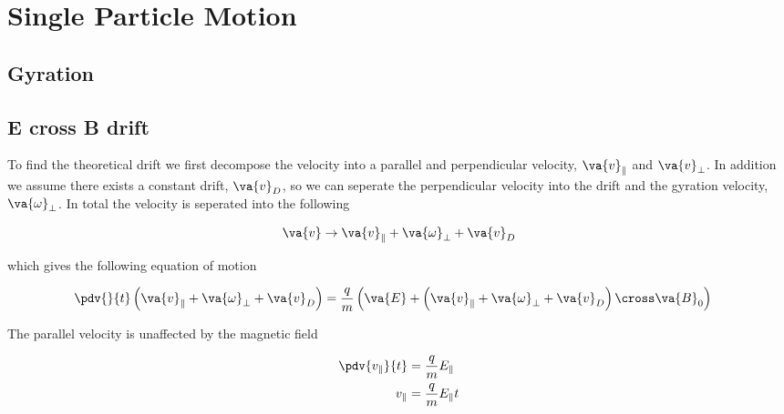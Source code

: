 \section{Single Particle Motion}

    \subsection{Gyration}

    \subsection{E cross B drift}
    To find the theoretical drift we first decompose the velocity into a parallel and perpendicular velocity, $\va{v}_\parallel $ and $\va{v}_\perp $. In addition we assume there exists a constant drift, \(\va{v}_D\), so we can seperate the perpendicular velocity into the drift and the gyration velocity, \(\va{\omega}_\perp\). In total the velocity is seperated into the following

    \[ \va{v} \rightarrow \va{v}_\parallel + \va{\omega}_\perp + \va{v}_D \]

    which gives the following equation of motion

    \begin{align}
       \pdv{}{t}\left( \va{v}_\parallel + \va{\omega}_\perp + \va{v}_D\right) &= \frac{q}{m} \left( \va{E} +   \left( \va{v}_\parallel + \va{\omega}_\perp + \va{v}_D \right)  \cross \va{B}_0 \right)
    \end{align}

    The parallel velocity is unaffected by the magnetic field

    \begin{align}
        \pdv{v_\parallel}{t} &= \frac{q}{m} E_\parallel
        \\
        v_\parallel &= \frac{q}{m} E_\parallel t
    \end{align}

